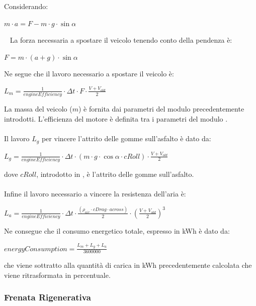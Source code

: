 \noindent
Considerando:

\begin{center}
	$\boxed{m \cdot a = F - m \cdot g \cdot \sin{\alpha} }$
\end{center}
~
\noindent
La forza necessaria a spostare il veicolo tenendo conto della pendenza è:

\begin{center}
	$\boxed{F = m \cdot (a + g) \cdot \sin{\alpha} }$
\end{center}

\noindent
Ne segue che il lavoro necessario a spostare il veicolo è:

\begin{center}
	$\boxed{L_m = \frac{1}{engineEfficiency} \cdot \Delta t \cdot F \cdot \frac{V + V_{old}}{2}}$
\end{center}

\noindent
La massa del veicolo ($m$) è fornita dai parametri del modulo  precedentemente introdotti. L'efficienza del motore è definita tra i parametri del modulo .
\\\\
Il lavoro $L_g$ per vincere l'attrito delle gomme sull'asfalto è dato da:

\begin{center}
$\boxed{L_g = \frac{1}{engineEfficiency} \cdot \Delta t \cdot (m \cdot g \cdot \cos{\alpha} \cdot cRoll) \cdot \frac{V + V_{old}}{2}}$
\end{center}
\noindent
dove $cRoll$, introdotto in , è l'attrito delle gomme sull'asfalto.
\\\\
\noindent
Infine il lavoro necessario a vincere la resistenza dell'aria è:

\begin{center}
	$\boxed{L_a = \frac{1}{engineEfficiency} \cdot \Delta t \cdot \frac{(\rho_{air} \cdot cDrag \cdot across)}{2} \cdot 	(\frac{V + V_{old}}{2})^3}$
\end{center}

Ne consegue che il consumo energetico totale, espresso in kWh è dato da:

\begin{center}
	$\boxed{energyConsumption = \frac{L_m + L_g + L_a}{3600000}}$
\end{center}
\noindent
che viene sottratto alla quantità di carica in kWh precedentemente calcolata che viene ritrasformata in percentuale.

\subsubsection{Frenata Rigenerativa}

